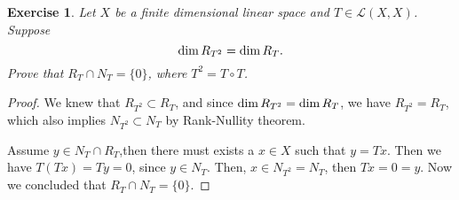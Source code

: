 \documentclass[11pt]{book}
\newtheorem{exercise}{Exercise}[section]
\theoremstyle{definition}
\numberwithin{equation}{subsection}
\begin{document}
\medskip

\begin{exercise}
Let $X$ be a finite dimensional linear space and $T\in\mathscr{L}(X,X)$. Suppose $${\rm dim}\, R_{T^2} = {\rm dim}\, R_T.$$
Prove that $R_T\cap N_T = \{0\}$, where $T^2 = T\circ T$.
\end{exercise}
\begin{proof}
We knew that $R_{T^2}\subset R_T$, and since ${\rm dim}\, R_{T^2} = {\rm dim}\, R_T$, we have $R_{T^2} = R_T$, which also implies $N_{T^2}\subset N_T$ by Rank-Nullity theorem.

Assume $y\in N_T\cap R_T$,then there must exists a $x\in X$ such that $y = T x$. Then we have $T(Tx) = Ty = 0$, since $y\in N_T$. Then, $x\in N_{T^2} = N_T$, then $Tx = 0 = y$. Now we concluded that $R_T\cap N_T = \{0\}$.
\end{proof}

\medskip
\end{document}
